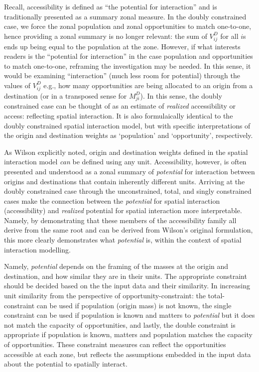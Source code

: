 \documentclass[
11pt, %
oneside, %
english, %
singlespacing, %
]{macthesis} %
\begin{document}


Recall, accessibility is defined as ``the potential for interaction'' and is traditionally presented as a summary zonal measure. In the doubly constrained case, we force the zonal population and zonal opportunities to match one-to-one, hence providing a zonal summary is no longer relevant: the sum of \(V_{ij}^D\) for all \(i\)s ends up being equal to the population at the zone. However, if what interests readers is the ``potential for interaction'' in the case population and opportunities to match one-to-one, reframing the investigation may be needed. In this sense, it would be examining ``interaction'' (much less room for potential) through the values of \(V_{ij}^D\) e.g., how many opportunities are being allocated to an origin from a destination (or in a transposed sense for \(M_{ji}^D\)). In this sense, the doubly constrained case can be thought of as an estimate of \emph{realized} accessibility or access: reflecting spatial interaction. It is also formulaically identical to the doubly constrained spatial interaction model, but with specific interpretations of the origin and destination weights as `population' and `opportunity', respectively.

As Wilson explicitly noted, origin and destination weights defined in the spatial interaction model \emph{can} be defined using any unit. Accessibility, however, is often presented and understood as a zonal summary of \emph{potential} for interaction between origins and destinations that contain inherently different units. Arriving at the doubly constrained case through the unconstrained, total, and singly constrained cases make the connection between the \emph{potential} for spatial interaction (accessibility) and \emph{realized} potential for spatial interaction more interpretable. Namely, by demonstrating that these members of the accessibility family all derive from the same root and can be derived from Wilson's original formulation, this more clearly demonstrates what \emph{potential} is, within the context of spatial interaction modelling.

Namely, \emph{potential} depends on the framing of the masses at the origin and destination, and how similar they are in their units. The appropriate constraint should be decided based on the the input data and their similarity. In increasing unit similarity from the perspective of opportunity-constraint: the total-constraint can be used if population (origin mass) is not known, the single constraint can be used if population is known and matters to \emph{potential} but it does not match the capacity of opportunities, and lastly, the double constraint is appropriate if population is known, matters and population matches the capacity of opportunities. These constraint measures can reflect the opportunities accessible at each zone, but reflects the assumptions embedded in the input data about the potential to spatially interact.
\end{document}
